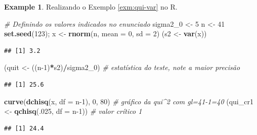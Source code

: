 \documentclass[
]{book}
\newenvironment{Shaded}{\begin{snugshade}}{\end{snugshade}}
\newcommand{\CommentTok}[1]{\textcolor[rgb]{0.56,0.35,0.01}{\textit{#1}}}
\newcommand{\DataTypeTok}[1]{\textcolor[rgb]{0.13,0.29,0.53}{#1}}
\newcommand{\DecValTok}[1]{\textcolor[rgb]{0.00,0.00,0.81}{#1}}
\newcommand{\KeywordTok}[1]{\textcolor[rgb]{0.13,0.29,0.53}{\textbf{#1}}}
\newcommand{\NormalTok}[1]{#1}
\newcommand{\OperatorTok}[1]{\textcolor[rgb]{0.81,0.36,0.00}{\textbf{#1}}}
\newcommand{\StringTok}[1]{\textcolor[rgb]{0.31,0.60,0.02}{#1}}
\theoremstyle{definition}
\theoremstyle{definition}
\newtheorem{example}{Example}[chapter]
\theoremstyle{definition}
\theoremstyle{remark}
\begin{document}
\begin{example}
\protect\hypertarget{exm:qui-var-r}{}{\label{exm:qui-var-r} }Realizando o Exemplo \ref{exm:qui-var} no R.
\end{example}

\begin{Shaded}
\begin{Highlighting}[]
\CommentTok{\# Definindo os valores indicados no enunciado}
\NormalTok{sigma2\_}\DecValTok{0}\NormalTok{ \textless{}{-}}\StringTok{ }\DecValTok{5}
\NormalTok{n \textless{}{-}}\StringTok{ }\DecValTok{41}
\KeywordTok{set.seed}\NormalTok{(}\DecValTok{123}\NormalTok{); x \textless{}{-}}\StringTok{ }\KeywordTok{rnorm}\NormalTok{(n, }\DataTypeTok{mean =} \DecValTok{0}\NormalTok{, }\DataTypeTok{sd =} \DecValTok{2}\NormalTok{)}
\NormalTok{(s2 \textless{}{-}}\StringTok{ }\KeywordTok{var}\NormalTok{(x))}
\end{Highlighting}
\end{Shaded}

\begin{verbatim}
## [1] 3.2
\end{verbatim}

\begin{Shaded}
\begin{Highlighting}[]
\NormalTok{(quit \textless{}{-}}\StringTok{ }\NormalTok{((n}\DecValTok{{-}1}\NormalTok{)}\OperatorTok{*}\NormalTok{s2)}\OperatorTok{/}\NormalTok{sigma2\_}\DecValTok{0}\NormalTok{) }\CommentTok{\# estatística do teste, note a maior precisão}
\end{Highlighting}
\end{Shaded}

\begin{verbatim}
## [1] 25.6
\end{verbatim}

\begin{Shaded}
\begin{Highlighting}[]
\KeywordTok{curve}\NormalTok{(}\KeywordTok{dchisq}\NormalTok{(x, }\DataTypeTok{df =}\NormalTok{ n}\DecValTok{{-}1}\NormalTok{), }\DecValTok{0}\NormalTok{, }\DecValTok{80}\NormalTok{) }\CommentTok{\# gráfico da qui\^{}2 com gl=41{-}1=40}
\NormalTok{(qui\_cr1 \textless{}{-}}\StringTok{ }\KeywordTok{qchisq}\NormalTok{(.}\DecValTok{025}\NormalTok{, }\DataTypeTok{df =}\NormalTok{ n}\DecValTok{{-}1}\NormalTok{)) }\CommentTok{\# valor crítico 1}
\end{Highlighting}
\end{Shaded}

\begin{verbatim}
## [1] 24.4
\end{verbatim}
\end{document}
